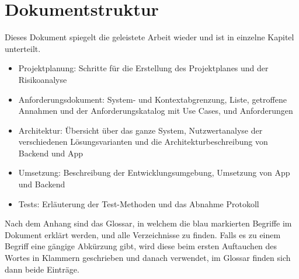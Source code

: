 \section{Dokumentstruktur}\label{nicht_ziele}
Dieses Dokument spiegelt die geleistete Arbeit wieder und ist in einzelne Kapitel unterteilt.
\begin{itemize}
\item Projektplanung: Schritte für die Erstellung des Projektplanes und der Risikoanalyse
\item Anforderungsdokument: System- und Kontextabgrenzung,  Liste, getroffene Annahmen und der Anforderungskatalog mit Use Cases,  und Anforderungen
\item Architektur: Übersicht über das ganze System, Nutzwertanalyse der verschiedenen Lösungsvarianten und die Architekturbeschreibung von Backend und App
\item Umsetzung: Beschreibung der Entwicklungsumgebung, Umsetzung von App und Backend
\item Tests: Erläuterung der Test-Methoden und das Abnahme Protokoll
\end{itemize}

Nach dem Anhang sind das Glossar, in welchem die blau markierten Begriffe im Dokument erklärt werden, und alle Verzeichnisse zu finden. Falls es zu einem Begriff eine gängige Abkürzung gibt, wird diese beim ersten Auftauchen des Wortes in Klammern geschrieben und danach verwendet, im Glossar finden sich dann beide Einträge.
